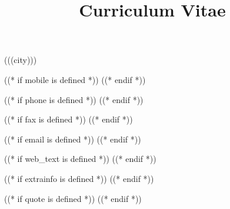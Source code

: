 

\title{Curriculum Vitae}
\address{(((address)))}{(((city)))}

((* if mobile is defined *))
((* endif *))

((* if phone is defined *))
((* endif *))

((* if fax is defined *))
((* endif *))

((* if email is defined *))
((* endif *))

((* if web_text is defined *))
((* endif *))

((* if extrainfo is defined *))
((* endif *))


((* if quote is defined *))
((* endif *))



\makecvtitle 


